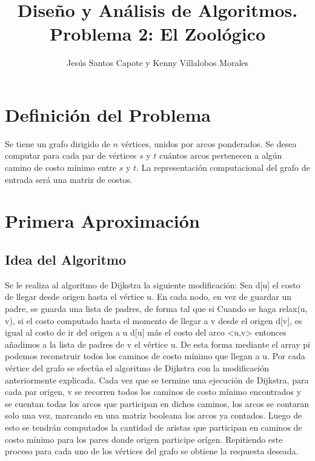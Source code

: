 \documentclass[article]{llncs}
\begin{document}
%
\title{Dise\~{n}o y An\'alisis de Algoritmos. Problema 2: El Zool\'ogico}
%
%
\author{Jes\'us Santos Capote y Kenny Villalobos Morales}
%
%
\maketitle              %
%
\section{Definici\'on del Problema}

Se tiene un grafo dirigido de $n$ vértices, unidos por arcos ponderados. Se desea computar para cada par 
de vértices $s$ y $t$ cuántos arcos pertenecen a algún camino de costo mínimo entre $s$ y $t$. La 
representación computacional del grafo de entrada será una matriz de costos.

\section{Primera Aproximaci\'on}

\subsection{Idea del Algoritmo}

Se le realiza al algoritmo de Dijkstra la siguiente modificaci\'on: Sea d[u] el costo de llegar desde origen hasta el v\'ertice u.   
En cada nodo, en vez de guardar un padre, se guarda una lista de padres, de forma tal que si  
Cuando se haga relax(u, v), si el costo 
computado hasta el momento de llegar a v  desde el origen d[v], es igual al costo de ir del origen a u d[u] m\'as 
el costo del arco <u,v> entonces a\~{n}adimos a la lista de padres de v el v\'ertice u. De esta forma 
mediante el array pi podemos reconstruir todos los caminos de costo m\'inimo que llegan a u. Por cada 
v\'ertice del grafo se efect\'ua el algoritmo de Dijkstra con la modificaci\'on anteriormente explicada. 
Cada vez que se termine una ejecuci\'on de Dijkstra, para cada par origen, v se recorren todos los caminos 
de costo m\'inimo encontrados y se cuentan todas los arcos que participan en dichos caminos, los arcos se 
contaran solo una vez, marcando en una matriz booleana los arcos ya contados. Luego de esto se tendr\'an 
computados la cantidad de aristas que participan en caminos de costo m\'inimo para los pares donde 
origen participe or\'igen. Repitiendo este proceso para cada uno de los v\'ertices del grafo se obtiene 
la respuesta deseada.
\end{document}
